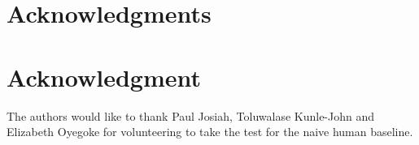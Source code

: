 \documentclass[conference]{IEEEtran}
\begin{document}




\ifCLASSOPTIONcompsoc
  \section*{Acknowledgments}
\else
  \section*{Acknowledgment}
\fi


The authors would like to thank Paul Josiah, Toluwalase Kunle-John and Elizabeth Oyegoke for volunteering to take the test for the naive human baseline.







%
%
%




\end{document}
